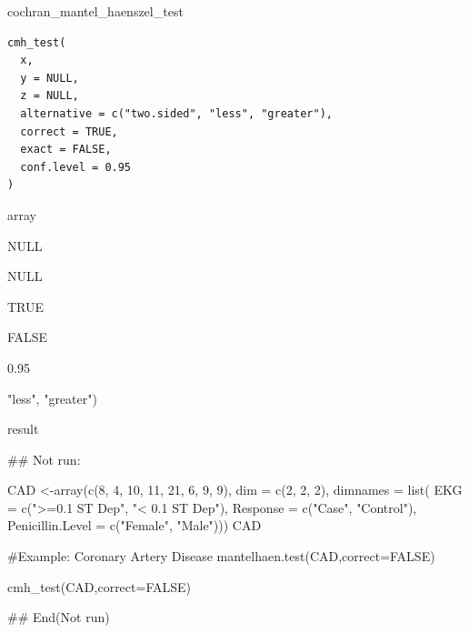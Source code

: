 \documentclass[a4paper]{book}
\begin{document}
%
\begin{Description}
cochran\_mantel\_haenszel\_test
\end{Description}
%
\begin{Usage}
\begin{verbatim}
cmh_test(
  x,
  y = NULL,
  z = NULL,
  alternative = c("two.sided", "less", "greater"),
  correct = TRUE,
  exact = FALSE,
  conf.level = 0.95
)
\end{verbatim}
\end{Usage}
%
\begin{Arguments}
\begin{ldescription}
\item[\code{x}] array

\item[\code{y}] NULL

\item[\code{z}] NULL

\item[\code{correct}] TRUE

\item[\code{exact}] FALSE

\item[\code{conf.level}] 0.95

\item[\code{alternativec("two.sided", }] "less", "greater")
\end{ldescription}
\end{Arguments}
%
\begin{Value}
result
\end{Value}
%
\begin{Examples}
\begin{ExampleCode}

\#\# Not run: 

CAD <-array(c(8, 4, 10, 11, 21, 6, 9, 9), dim = c(2, 2, 2),
            dimnames = list(
              EKG = c(">=0.1 ST Dep", "< 0.1 ST Dep"),
              Response = c("Case", "Control"),
              Penicillin.Level = c("Female", "Male")))
CAD

#Example: Coronary Artery Disease
mantelhaen.test(CAD,correct=FALSE)

cmh_test(CAD,correct=FALSE)%


## End(Not run)
\end{ExampleCode}
\end{Examples}
\end{document}
